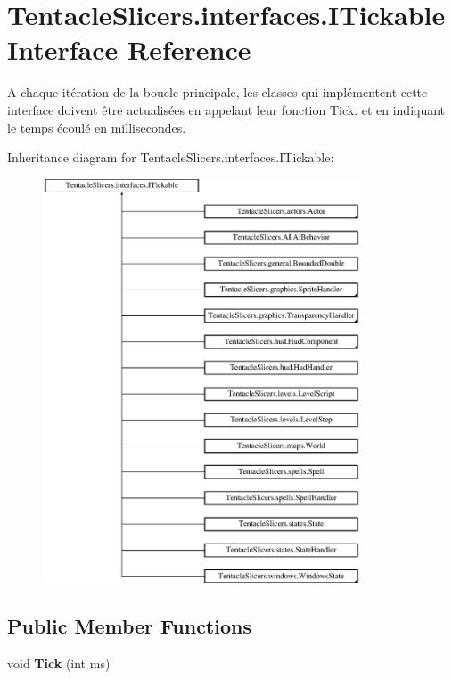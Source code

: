 \hypertarget{interface_tentacle_slicers_1_1interfaces_1_1_i_tickable}{}\section{Tentacle\+Slicers.\+interfaces.\+I\+Tickable Interface Reference}
\label{interface_tentacle_slicers_1_1interfaces_1_1_i_tickable}


A chaque itération de la boucle principale, les classes qui implémentent cette interface doivent être actualisées en appelant leur fonction Tick. et en indiquant le temps écoulé en millisecondes.  


Inheritance diagram for Tentacle\+Slicers.\+interfaces.\+I\+Tickable\+:\begin{figure}[H]
\begin{center}
\leavevmode
\includegraphics[height=12.000000cm]{interface_tentacle_slicers_1_1interfaces_1_1_i_tickable}
\end{center}
\end{figure}
\subsection*{Public Member Functions}
\begin{DoxyCompactItemize}
\item 
\mbox{\label{interface_tentacle_slicers_1_1interfaces_1_1_i_tickable_a80bdccf23fa69fb85c3066e61c854b99}} 
void {\bfseries Tick} (int ms)
\end{DoxyCompactItemize}


